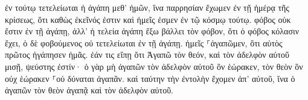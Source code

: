 \documentclass{openreader}
\begin{document}
ἐν τούτῳ τετελείωται ἡ ἀγάπη μεθ’ ἡμῶν, ἵνα παρρησίαν ἔχωμεν ἐν τῇ ἡμέρᾳ τῆς κρίσεως, ὅτι καθὼς ἐκεῖνός ἐστιν καὶ ἡμεῖς ἐσμεν ἐν τῷ κόσμῳ τούτῳ. 
φόβος οὐκ ἔστιν ἐν τῇ ἀγάπῃ, ἀλλ’ ἡ τελεία ἀγάπη ἔξω βάλλει τὸν φόβον, ὅτι ὁ φόβος κόλασιν ἔχει, ὁ δὲ φοβούμενος οὐ τετελείωται ἐν τῇ ἀγάπῃ. 
ἡμεῖς ⸀ἀγαπῶμεν, ὅτι αὐτὸς πρῶτος ἠγάπησεν ἡμᾶς. 
ἐάν τις εἴπῃ ὅτι Ἀγαπῶ τὸν θεόν, καὶ τὸν ἀδελφὸν αὐτοῦ μισῇ, ψεύστης ἐστίν· ὁ γὰρ μὴ ἀγαπῶν τὸν ἀδελφὸν αὐτοῦ ὃν ἑώρακεν, τὸν θεὸν ὃν οὐχ ἑώρακεν ⸀οὐ δύναται ἀγαπᾶν. 
καὶ ταύτην τὴν ἐντολὴν ἔχομεν ἀπ’ αὐτοῦ, ἵνα ὁ ἀγαπῶν τὸν θεὸν ἀγαπᾷ καὶ τὸν ἀδελφὸν αὐτοῦ. 
\end{document}
